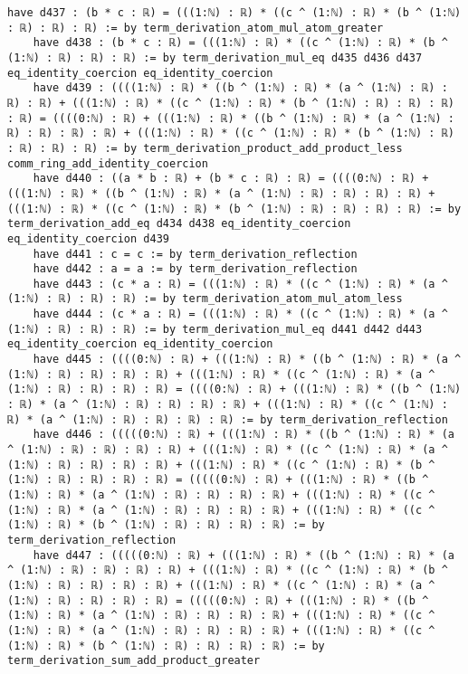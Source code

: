 \documentclass{article}
\begin{document}
\begin{tcolorbox}[colback=white!10, width=\linewidth]
\begin{lstlisting}[language=Lean4]
    have d437 : (b * c : ℝ) = (((1:ℕ) : ℝ) * ((c ^ (1:ℕ) : ℝ) * (b ^ (1:ℕ) : ℝ) : ℝ) : ℝ) := by term_derivation_atom_mul_atom_greater
    have d438 : (b * c : ℝ) = (((1:ℕ) : ℝ) * ((c ^ (1:ℕ) : ℝ) * (b ^ (1:ℕ) : ℝ) : ℝ) : ℝ) := by term_derivation_mul_eq d435 d436 d437 eq_identity_coercion eq_identity_coercion
    have d439 : ((((1:ℕ) : ℝ) * ((b ^ (1:ℕ) : ℝ) * (a ^ (1:ℕ) : ℝ) : ℝ) : ℝ) + (((1:ℕ) : ℝ) * ((c ^ (1:ℕ) : ℝ) * (b ^ (1:ℕ) : ℝ) : ℝ) : ℝ) : ℝ) = ((((0:ℕ) : ℝ) + (((1:ℕ) : ℝ) * ((b ^ (1:ℕ) : ℝ) * (a ^ (1:ℕ) : ℝ) : ℝ) : ℝ) : ℝ) + (((1:ℕ) : ℝ) * ((c ^ (1:ℕ) : ℝ) * (b ^ (1:ℕ) : ℝ) : ℝ) : ℝ) : ℝ) := by term_derivation_product_add_product_less comm_ring_add_identity_coercion
    have d440 : ((a * b : ℝ) + (b * c : ℝ) : ℝ) = ((((0:ℕ) : ℝ) + (((1:ℕ) : ℝ) * ((b ^ (1:ℕ) : ℝ) * (a ^ (1:ℕ) : ℝ) : ℝ) : ℝ) : ℝ) + (((1:ℕ) : ℝ) * ((c ^ (1:ℕ) : ℝ) * (b ^ (1:ℕ) : ℝ) : ℝ) : ℝ) : ℝ) := by term_derivation_add_eq d434 d438 eq_identity_coercion eq_identity_coercion d439
    have d441 : c = c := by term_derivation_reflection
    have d442 : a = a := by term_derivation_reflection
    have d443 : (c * a : ℝ) = (((1:ℕ) : ℝ) * ((c ^ (1:ℕ) : ℝ) * (a ^ (1:ℕ) : ℝ) : ℝ) : ℝ) := by term_derivation_atom_mul_atom_less
    have d444 : (c * a : ℝ) = (((1:ℕ) : ℝ) * ((c ^ (1:ℕ) : ℝ) * (a ^ (1:ℕ) : ℝ) : ℝ) : ℝ) := by term_derivation_mul_eq d441 d442 d443 eq_identity_coercion eq_identity_coercion
    have d445 : ((((0:ℕ) : ℝ) + (((1:ℕ) : ℝ) * ((b ^ (1:ℕ) : ℝ) * (a ^ (1:ℕ) : ℝ) : ℝ) : ℝ) : ℝ) + (((1:ℕ) : ℝ) * ((c ^ (1:ℕ) : ℝ) * (a ^ (1:ℕ) : ℝ) : ℝ) : ℝ) : ℝ) = ((((0:ℕ) : ℝ) + (((1:ℕ) : ℝ) * ((b ^ (1:ℕ) : ℝ) * (a ^ (1:ℕ) : ℝ) : ℝ) : ℝ) : ℝ) + (((1:ℕ) : ℝ) * ((c ^ (1:ℕ) : ℝ) * (a ^ (1:ℕ) : ℝ) : ℝ) : ℝ) : ℝ) := by term_derivation_reflection
    have d446 : (((((0:ℕ) : ℝ) + (((1:ℕ) : ℝ) * ((b ^ (1:ℕ) : ℝ) * (a ^ (1:ℕ) : ℝ) : ℝ) : ℝ) : ℝ) + (((1:ℕ) : ℝ) * ((c ^ (1:ℕ) : ℝ) * (a ^ (1:ℕ) : ℝ) : ℝ) : ℝ) : ℝ) + (((1:ℕ) : ℝ) * ((c ^ (1:ℕ) : ℝ) * (b ^ (1:ℕ) : ℝ) : ℝ) : ℝ) : ℝ) = (((((0:ℕ) : ℝ) + (((1:ℕ) : ℝ) * ((b ^ (1:ℕ) : ℝ) * (a ^ (1:ℕ) : ℝ) : ℝ) : ℝ) : ℝ) + (((1:ℕ) : ℝ) * ((c ^ (1:ℕ) : ℝ) * (a ^ (1:ℕ) : ℝ) : ℝ) : ℝ) : ℝ) + (((1:ℕ) : ℝ) * ((c ^ (1:ℕ) : ℝ) * (b ^ (1:ℕ) : ℝ) : ℝ) : ℝ) : ℝ) := by term_derivation_reflection
    have d447 : (((((0:ℕ) : ℝ) + (((1:ℕ) : ℝ) * ((b ^ (1:ℕ) : ℝ) * (a ^ (1:ℕ) : ℝ) : ℝ) : ℝ) : ℝ) + (((1:ℕ) : ℝ) * ((c ^ (1:ℕ) : ℝ) * (b ^ (1:ℕ) : ℝ) : ℝ) : ℝ) : ℝ) + (((1:ℕ) : ℝ) * ((c ^ (1:ℕ) : ℝ) * (a ^ (1:ℕ) : ℝ) : ℝ) : ℝ) : ℝ) = (((((0:ℕ) : ℝ) + (((1:ℕ) : ℝ) * ((b ^ (1:ℕ) : ℝ) * (a ^ (1:ℕ) : ℝ) : ℝ) : ℝ) : ℝ) + (((1:ℕ) : ℝ) * ((c ^ (1:ℕ) : ℝ) * (a ^ (1:ℕ) : ℝ) : ℝ) : ℝ) : ℝ) + (((1:ℕ) : ℝ) * ((c ^ (1:ℕ) : ℝ) * (b ^ (1:ℕ) : ℝ) : ℝ) : ℝ) : ℝ) := by term_derivation_sum_add_product_greater

\end{lstlisting}
\end{tcolorbox}
\end{document}
